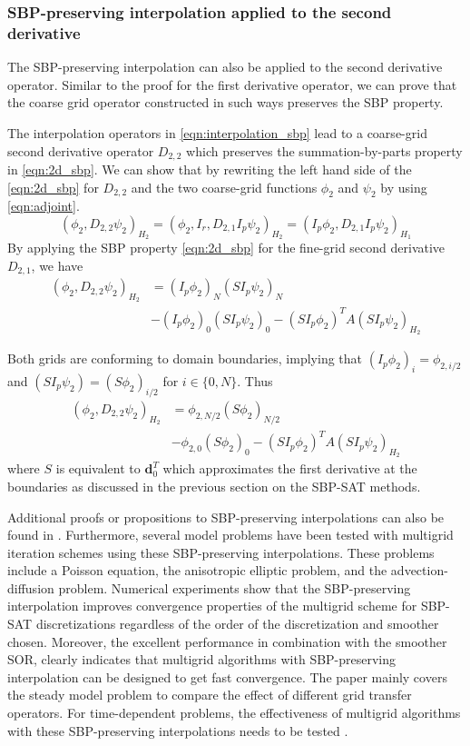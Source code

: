 \subsubsection{SBP-preserving interpolation applied to the second derivative}
The SBP-preserving interpolation can also be applied to the second derivative operator. Similar to the proof for the first derivative operator, we can prove that the coarse grid operator constructed in such ways preserves the SBP property.

The interpolation operators in \autoref{eqn:interpolation_sbp} lead to a coarse-grid second derivative operator $D_{2,2}$ which preserves the summation-by-parts property in \autoref{eqn:2d_sbp}. We can show that by rewriting the left hand side of the \autoref{eqn:2d_sbp} for $D_{2,2}$ and the two coarse-grid functions $\phi_2$ and $\psi_2$ by using \autoref{eqn:adjoint}.
\begin{equation}
    (\phi_2,D_{2,2}\psi_2)_{H_2} = (\phi_2,I_r,D_{2,1}I_p\psi_2)_{H_2} = (I_p\phi_2,D_{2,1}I_p\psi_2)_{H_1}
\end{equation}
By applying the SBP property \autoref{eqn:2d_sbp} for the fine-grid second derivative $D_{2,1}$, we have
\begin{align}
    (\phi_2,D_{2,2}\psi_2)_{H_2} &= (I_p\phi_2)_N(SI_p\psi_2)_N \nonumber \\ &- (I_p\phi_2)_0(SI_p\psi_2)_0 - (SI_p\phi_2)^TA(SI_p\psi_2)_{H_2}
\end{align}

Both grids are conforming to domain boundaries, implying that $(I_p\phi_2)_i = \phi_{2,i/2}$ and $(SI_p\psi_2) = (S\phi_2)_{i/2}$ for $i\in\{0,N\}$. Thus 
\begin{align}
     (\phi_2,D_{2,2}\psi_2)_{H_2} &= \phi_{2,N/2}(S\phi_2)_{N/2} \nonumber\\ &- \phi_{2,0}(S\phi_2)_0 - (SI_p\phi_2)^TA(SI_p\psi_2)_{H_2}
\end{align}
where $S$ is equivalent to $\boldsymbol{d}_0^T$ which approximates the first derivative at the boundaries as discussed in the previous section on the SBP-SAT methods.

Additional proofs or propositions to SBP-preserving interpolations can also be found in  \citep{ruggiu2018new}. Furthermore, several model problems have been tested with multigrid iteration schemes using these SBP-preserving interpolations. These problems include a Poisson equation, the anisotropic elliptic problem, and the advection-diffusion problem. Numerical experiments show that the SBP-preserving interpolation improves convergence properties of the multigrid scheme for SBP-SAT discretizations regardless of the order of the discretization and smoother chosen. Moreover, the excellent performance in combination with the smoother SOR, clearly indicates that multigrid algorithms with SBP-preserving interpolation can be designed to get fast convergence. The paper mainly covers the steady model problem to compare the effect of different grid transfer operators. For time-dependent problems, the effectiveness of multigrid algorithms with these SBP-preserving interpolations needs to be tested \citep{ruggiu2018new}.


